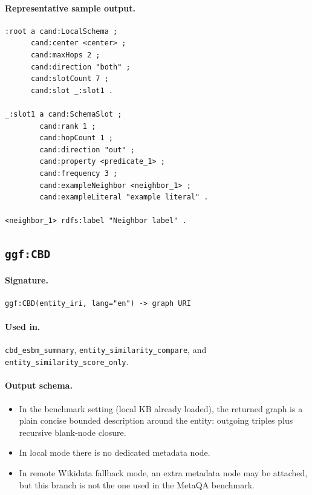 \paragraph{Representative sample output.}
\begin{verbatim}
:root a cand:LocalSchema ;
      cand:center <center> ;
      cand:maxHops 2 ;
      cand:direction "both" ;
      cand:slotCount 7 ;
      cand:slot _:slot1 .

_:slot1 a cand:SchemaSlot ;
        cand:rank 1 ;
        cand:hopCount 1 ;
        cand:direction "out" ;
        cand:property <predicate_1> ;
        cand:frequency 3 ;
        cand:exampleNeighbor <neighbor_1> ;
        cand:exampleLiteral "example literal" .

<neighbor_1> rdfs:label "Neighbor label" .
\end{verbatim}

\subsection{\texttt{ggf:CBD}}
\label{subsec:ggf-cbd}

\paragraph{Signature.}
\begin{verbatim}
ggf:CBD(entity_iri, lang="en") -> graph URI
\end{verbatim}

\paragraph{Used in.}
\texttt{cbd\_esbm\_summary}, \texttt{entity\_similarity\_compare}, and
\texttt{entity\_similarity\_score\_only}.

\paragraph{Output schema.}
\begin{itemize}
\item In the benchmark setting (local KB already loaded), the returned graph is
a plain concise bounded description around the entity:
outgoing triples plus recursive blank-node closure.
\item In local mode there is no dedicated metadata node.
\item In remote Wikidata fallback mode, an extra metadata node may be attached,
but this branch is not the one used in the MetaQA benchmark.
\end{itemize}

